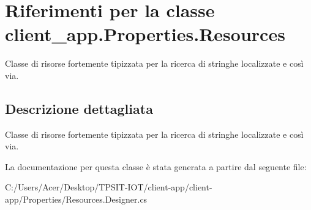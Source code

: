 \hypertarget{classclient__app_1_1_properties_1_1_resources}{}\section{Riferimenti per la classe client\+\_\+app.\+Properties.\+Resources}
\label{classclient__app_1_1_properties_1_1_resources}


Classe di risorse fortemente tipizzata per la ricerca di stringhe localizzate e così via.  




\subsection{Descrizione dettagliata}
Classe di risorse fortemente tipizzata per la ricerca di stringhe localizzate e così via. 



La documentazione per questa classe è stata generata a partire dal seguente file\+:\begin{DoxyCompactItemize}
\item 
C\+:/\+Users/\+Acer/\+Desktop/\+T\+P\+S\+I\+T-\/\+I\+O\+T/client-\/app/client-\/app/\+Properties/Resources.\+Designer.\+cs\end{DoxyCompactItemize}

